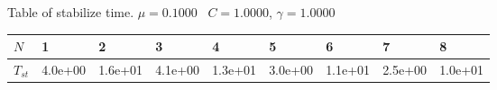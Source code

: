 \begin{center}
Table of stabilize time. $\mu = 0.1000$ \, $C = 1.0000$, $\gamma = 1.0000$
  
\begin{tabular}{|p{0.6in}|p{0.6in}|p{0.6in}|p{0.6in}|p{0.6in}|p{0.6in}|p{0.6in}|p{0.6in}|p{0.6in}|} \hline
$N$ &1 &2 &3 &4 &5 &6 &7 &8 \\ \hline 
$T_{st}$ &4.0e+00 &1.6e+01 &4.1e+00 &1.3e+01 &3.0e+00 &1.1e+01 &2.5e+00 &1.0e+01 \\ \hline 

\end{tabular}\\[20pt]
\end{center}
